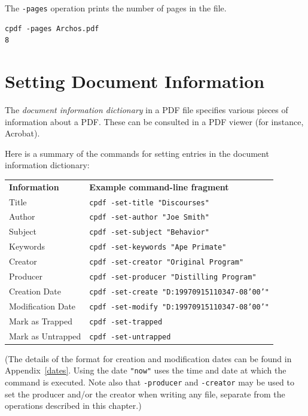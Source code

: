 \documentclass{book}
\newcommand{\smallgap}{\bigskip}
\begin{document}
\smallgap 
\noindent The \texttt{-pages} operation prints the number of pages in the file.
\begin{framed}
{\small\begin{verbatim}
cpdf -pages Archos.pdf
8
\end{verbatim}}
\end{framed}

\section{Setting Document Information}
\label{setdocinfo}
  The \textit{document information dictionary} in a PDF file specifies various
pieces of information about a PDF. These can be consulted in a PDF viewer (for
instance, Acrobat).

  Here is a summary of the commands for setting entries in the document
information dictionary:

{\small\begin{framed}
    \noindent\begin{tabular}{ll}
       \textbf{Information} & \textbf{Example command-line fragment} \\
       Title & \texttt{cpdf -set-title "Discourses"} \\
       Author & \texttt{cpdf -set-author "Joe Smith"} \\
       Subject & \texttt{cpdf -set-subject "Behavior"} \\
       Keywords & \texttt{cpdf -set-keywords "Ape Primate"} \\
       Creator & \texttt{cpdf -set-creator "Original Program"} \\
       Producer & \texttt{cpdf -set-producer "Distilling Program"} \\
       Creation Date & \texttt{cpdf -set-create "D:19970915110347-08'00'"} \\
       Modification Date & \texttt{cpdf -set-modify "D:19970915110347-08'00'"} \\
       Mark as Trapped & \texttt{cpdf -set-trapped} \\
       Mark as Untrapped & \texttt{cpdf -set-untrapped} \\
    \end{tabular}
\end{framed}}

  \noindent (The details of the format for creation and modification dates can be found
in Appendix~\ref{dates}. Using the date \texttt{"now"} uses the time and date
at which the command is executed. Note also that \texttt{-producer} and \texttt{-creator} may be used to set the producer and/or the creator when writing any file, separate from the operations described in this chapter.)
  
\end{document}
